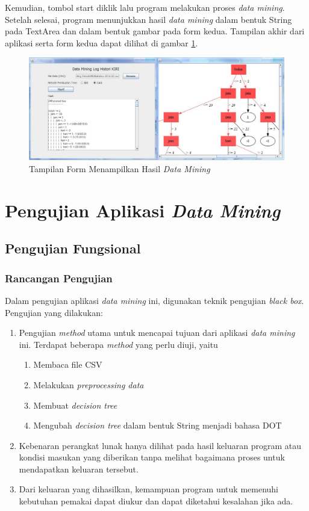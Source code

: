 Kemudian, tombol start diklik lalu program melakukan proses \textsl{data mining}. Setelah selesai, program menunjukkan hasil \textsl{data mining} dalam bentuk String pada TextArea dan dalam bentuk gambar pada form kedua. Tampilan akhir dari aplikasi serta form kedua dapat dilihat di gambar \ref{fig:GUI5}.

\begin{figure}[H]
\centering
\includegraphics[scale=0.5]{Gambar/GUI5.jpg}
\caption[Tampilan Form Menampilkan Hasil \textsl{Data Mining}]{Tampilan Form Menampilkan Hasil \textsl{Data Mining}} 
\label{fig:GUI5}
\end{figure}

\section{Pengujian Aplikasi \textsl{Data Mining}}

\subsection{Pengujian Fungsional}

\subsubsection{Rancangan Pengujian}

Dalam pengujian aplikasi \textsl{data mining} ini, digunakan teknik pengujian \textsl{black box}. Pengujian yang dilakukan:
\begin{enumerate}
	\item Pengujian \textsl{method} utama untuk mencapai tujuan dari aplikasi \textsl{data mining} ini. Terdapat beberapa \textsl{method} yang perlu diuji, yaitu
	\begin{enumerate}
		\item Membaca file CSV
		\item Melakukan \textsl{preprocessing data}
		\item Membuat \textsl{decision tree}
		\item Mengubah \textsl{decision tree} dalam bentuk String menjadi bahasa DOT
	\end{enumerate}
	\item Kebenaran perangkat lunak hanya dilihat pada hasil keluaran program atau kondisi masukan yang diberikan tanpa melihat bagaimana proses untuk mendapatkan keluaran tersebut.
	\item Dari keluaran yang dihasilkan, kemampuan program untuk memenuhi kebutuhan pemakai dapat diukur dan dapat diketahui kesalahan jika ada.
\end{enumerate}


